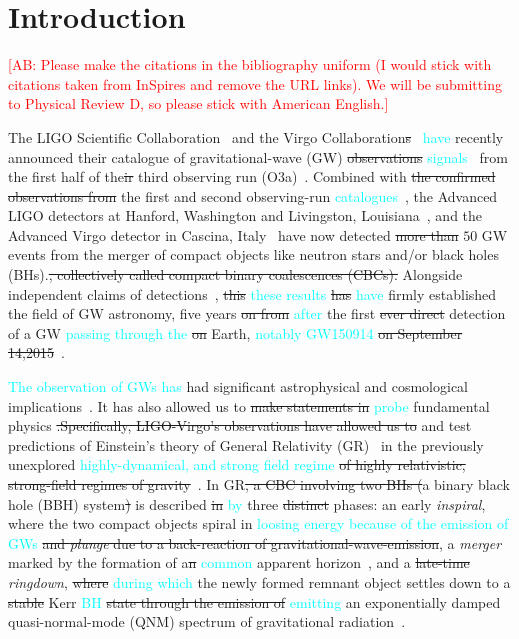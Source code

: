 \documentclass[twocolumn,prd,superscriptaddress,amsfonts,amssymb,amsmath,preprintnumbers]{revtex4-1}
\newcommand{\ab}[1]{\textcolor{cyan}{#1}}
\newcommand{\comment}[1]{\textcolor{red}{[#1]}}
\begin{document}
\maketitle


\section{Introduction}\label{sec:intro}

\comment{AB: Please make the citations in the bibliography uniform (I would stick with citations 
taken from InSpires and remove the URL links). We will be submitting to Physical Review D, so please 
stick with American English.}

The LIGO Scientific Collaboration~\citep{lsc} and the Virgo
Collaboration\sout{s}~\citep{Virgo} \ab{have} recently announced their catalogue of
gravitational-wave (GW) \sout{observations} \ab{signals}~\citep{GWTC-2} from the first
half of the\sout{ir} third observing run (O3a)~\citep{O3reference}. Combined
with \sout{the confirmed observations from} the first and second observing-run \ab{catalogues}~\citep{abbott2019gwtc}, the Advanced LIGO detectors at Hanford,
Washington and Livingston, Louisiana~\citep{aasi2015characterization},
and the Advanced Virgo detector in Cascina,
Italy~\citep{acernese2014advanced} have now detected \sout{more than} $50$ GW
events from the merger of compact objects like neutron stars and/or
black holes (BHs).\sout{, collectively called compact binary coalescences
(CBCs).} Alongside independent claims of
detections~\citep{nitz20191,nitz20202,2019PhRvD.100b3007Z,2020PhRvD.101h3030V,Venumadhav_2020},
\sout{this} \ab{these results} \sout{has} \ab{have} firmly established the field of GW astronomy, five years \sout{on
from} \ab{after} the first \sout{ever direct} detection of a GW \ab{passing through the} \sout{on} Earth, \ab{notably GW150914} 
\sout{on September 14,2015}~\citep{abbott2016observation}.

\ab{The observation of GWs has} had significant astrophysical and cosmological
implications~\citep{LSC_2016astroph,gw170817_mma,gw170817_joint,gw170817_hubble}. It
has also allowed us to \sout{make statements in} \ab{probe} fundamental
physics \sout{.Specifically, LIGO-Virgo's observations have allowed us to} and 
test predictions of Einstein's theory of General Relativity 
(GR)~\citep{GR} in the previously unexplored \ab{highly-dynamical, and strong field 
regime} \sout{of highly relativistic, strong-field regimes of
gravity}~\citep{LSC_2016grtests,GW170817_TGR,gwtc1_tgr}. In GR\sout{, a CBC
involving two BHs (}a binary black hole (BBH) system\sout{)} is described \sout{in} \ab{by}
three \sout{distinct} phases: an early \textit{inspiral}, where the two
compact objects spiral in \ab{loosing energy because of the emission of GWs} \sout{and \textit{plunge} due to a back-reaction
of gravitational-wave-emission}, a \textit{merger} marked by the
formation of a\sout{n} \ab{common} apparent horizon~\citep{NRpaper}, and a \sout{late-time} 
\textit{ringdown}, \sout{where} \ab{during which} the newly formed remnant object settles down
to a \sout{stable} Kerr \ab{BH} \sout{state through the emission of} \ab{emitting} an exponentially damped
quasi-normal-mode (QNM) spectrum of gravitational
radiation~\citep{vishu,earlyqnmpapers}.
\end{document}
